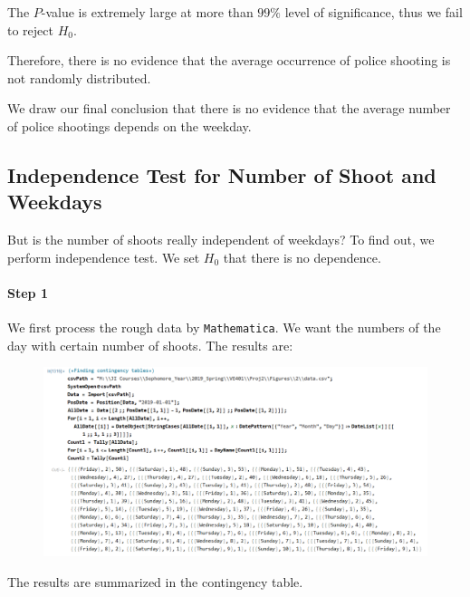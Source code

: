 \documentclass[a4paper]{article}
\begin{document}
The $P$-value is extremely large at more than $99\%$ level of significance, thus we fail to reject $H_0$.

Therefore, there is no evidence that the average occurrence of police shooting is not randomly distributed. 

We draw our final conclusion that there is no evidence that the average number of police shootings depends on the weekday.

\subsection{Independence Test for Number of Shoot and Weekdays}
But is the number of shoots really independent of weekdays? To find out, we perform independence test. We set $H_0$ that there is no dependence.

\paragraph{Step 1} We first process the rough data by \texttt{Mathematica}. We want the numbers of the day with certain number of shoots. The results are:

\begin{figure}[!htbp]
\centering
\includegraphics[width=1.1\linewidth]{dataprocess6.png}
\end{figure}

\newpage

The results are summarized in the contingency table.
\end{document}
